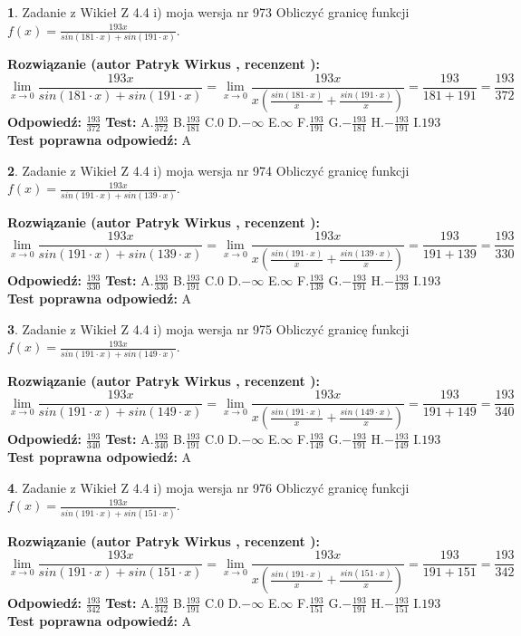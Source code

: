 \documentclass[12pt, a4paper]{article}
\theoremstyle{definition} %
\newtheorem{zad}{}
\newcommand{\zadStart}[1]{\begin{zad}#1\newline}
\newcommand{\zadStop}{\end{zad}}
\newcommand{\rozwStart}[2]{\noindent \textbf{Rozwiązanie (autor #1 , recenzent #2): }\newline}
\newcommand{\rozwStop}{\newline}
\newcommand{\odpStart}{\noindent \textbf{Odpowiedź:}\newline}
\newcommand{\odpStop}{\newline}
\newcommand{\testStart}{\noindent \textbf{Test:}\newline}
\newcommand{\testStop}{\newline}
\newcommand{\kluczStart}{\noindent \textbf{Test poprawna odpowiedź:}\newline}
\newcommand{\kluczStop}{\newline}
\begin{document}
\zadStart{Zadanie z Wikieł Z 4.4 i) moja wersja nr 973}
Obliczyć granicę funkcji $f(x)=\frac{193x}{sin(181\cdot x) +sin(191\cdot x)}$.
\zadStop
\rozwStart{Patryk Wirkus}{}
$$\lim\limits_{x\to 0}\frac{193x}{sin(181\cdot x) +sin(191\cdot x)}=\lim\limits_{x\to 0}\frac{193x}{x(\frac{sin(181\cdot x)}{x}+\frac{sin(191\cdot x)}{x})}=\frac{193}{181+191} = \frac{193}{372}$$
\rozwStop
\odpStart
$\frac{193}{372}$
\odpStop
\testStart
A.$\frac{193}{372}$
B.$\frac{193}{181}$
C.$0$
D.$-\infty$
E.$\infty$
F.$\frac{193}{191}$
G.$-\frac{193}{181}$
H.$-\frac{193}{191}$
I.$193$
\testStop
\kluczStart
A
\kluczStop



\zadStart{Zadanie z Wikieł Z 4.4 i) moja wersja nr 974}
Obliczyć granicę funkcji $f(x)=\frac{193x}{sin(191\cdot x) +sin(139\cdot x)}$.
\zadStop
\rozwStart{Patryk Wirkus}{}
$$\lim\limits_{x\to 0}\frac{193x}{sin(191\cdot x) +sin(139\cdot x)}=\lim\limits_{x\to 0}\frac{193x}{x(\frac{sin(191\cdot x)}{x}+\frac{sin(139\cdot x)}{x})}=\frac{193}{191+139} = \frac{193}{330}$$
\rozwStop
\odpStart
$\frac{193}{330}$
\odpStop
\testStart
A.$\frac{193}{330}$
B.$\frac{193}{191}$
C.$0$
D.$-\infty$
E.$\infty$
F.$\frac{193}{139}$
G.$-\frac{193}{191}$
H.$-\frac{193}{139}$
I.$193$
\testStop
\kluczStart
A
\kluczStop



\zadStart{Zadanie z Wikieł Z 4.4 i) moja wersja nr 975}
Obliczyć granicę funkcji $f(x)=\frac{193x}{sin(191\cdot x) +sin(149\cdot x)}$.
\zadStop
\rozwStart{Patryk Wirkus}{}
$$\lim\limits_{x\to 0}\frac{193x}{sin(191\cdot x) +sin(149\cdot x)}=\lim\limits_{x\to 0}\frac{193x}{x(\frac{sin(191\cdot x)}{x}+\frac{sin(149\cdot x)}{x})}=\frac{193}{191+149} = \frac{193}{340}$$
\rozwStop
\odpStart
$\frac{193}{340}$
\odpStop
\testStart
A.$\frac{193}{340}$
B.$\frac{193}{191}$
C.$0$
D.$-\infty$
E.$\infty$
F.$\frac{193}{149}$
G.$-\frac{193}{191}$
H.$-\frac{193}{149}$
I.$193$
\testStop
\kluczStart
A
\kluczStop



\zadStart{Zadanie z Wikieł Z 4.4 i) moja wersja nr 976}
Obliczyć granicę funkcji $f(x)=\frac{193x}{sin(191\cdot x) +sin(151\cdot x)}$.
\zadStop
\rozwStart{Patryk Wirkus}{}
$$\lim\limits_{x\to 0}\frac{193x}{sin(191\cdot x) +sin(151\cdot x)}=\lim\limits_{x\to 0}\frac{193x}{x(\frac{sin(191\cdot x)}{x}+\frac{sin(151\cdot x)}{x})}=\frac{193}{191+151} = \frac{193}{342}$$
\rozwStop
\odpStart
$\frac{193}{342}$
\odpStop
\testStart
A.$\frac{193}{342}$
B.$\frac{193}{191}$
C.$0$
D.$-\infty$
E.$\infty$
F.$\frac{193}{151}$
G.$-\frac{193}{191}$
H.$-\frac{193}{151}$
I.$193$
\testStop
\kluczStart
A
\kluczStop
\end{document}
